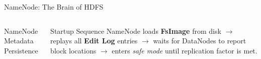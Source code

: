 \documentclass[aspectratio=169,10pt]{beamer}
\begin{document}
\begin{frame}{NameNode: The Brain of HDFS}
\begin{columns}[T]
\begin{exampleblock}{NameNode Metadata Persistence}
\begin{center}
        \end{center}
      \end{exampleblock}
      \vspace{4pt}
      \begin{block}{Startup Sequence}
        \small NameNode loads \textbf{FsImage} from disk $\to$ replays all \textbf{Edit Log} entries $\to$ waits for DataNodes to report block locations $\to$ enters \emph{safe mode} until replication factor is met.
      \end{block}
  \end{columns}
\end{frame}
\end{document}
